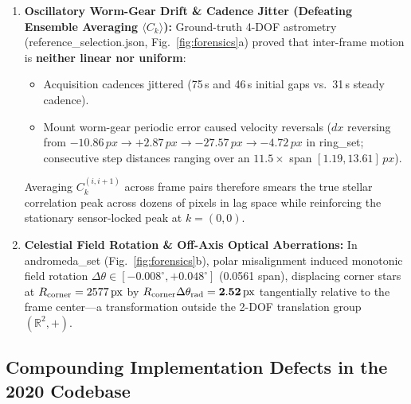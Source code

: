 \documentclass[10pt,twocolumn,letterpaper]{article}
\DeclareRobustCommand{\code}[1]{\texttt{#1}}
\def\code#1{#1}%
\def\bm#1{#1}%
\def\allowbreak{}%
\begin{document}
\begin{enumerate}
  \item \textbf{Oscillatory Worm-Gear Drift \& Cadence Jitter (Defeating Ensemble Averaging $\langle C_{\bm{k}} \rangle$):}
  Ground-truth 4-DOF astrometry (\code{reference\_\allowbreak selection.json}, Fig.~\ref{fig:forensics}a) proved that inter-frame motion is \textbf{neither linear nor uniform}:
  \begin{itemize}
    \item Acquisition cadences jittered (\code{75\,s} and \code{46\,s} initial gaps vs.\ \code{31\,s} steady cadence).
    \item Mount worm-gear periodic error caused velocity reversals ($\code{dx}$ reversing from $\code{-10.86\,px} \to \code{+2.87\,px} \to \code{-27.57\,px} \to \code{-4.72\,px}$ in \code{ring\_set}; consecutive step distances ranging over an $11.5\times$ span $\code{[1.19, 13.61]\,px}$).
  \end{itemize}
  Averaging $C_{\bm{k}}^{(i, i+1)}$ across frame pairs therefore smears the true stellar correlation peak across dozens of pixels in lag space while reinforcing the stationary sensor-locked peak at $\bm{k} = (0, 0)$.

  \item \textbf{Celestial Field Rotation \& Off-Axis Optical Aberrations:}
  In \code{andromeda\_set} (Fig.~\ref{fig:forensics}b), polar misalignment induced monotonic field rotation $\Delta\theta \in [-0.008^\circ, +0.048^\circ]$ (\code{0.0561\textdegree} span), displacing corner stars at $R_{\text{corner}} = 2577\text{\,px}$ by $R_{\text{corner}} \Delta\theta_{\text{rad}} = \mathbf{2.52\text{\,px}}$ tangentially relative to the frame center---a transformation outside the 2-DOF translation group $(\mathbb{R}^2, +)$.
\end{enumerate}

\subsection{Compounding Implementation Defects in the 2020 Codebase}
\end{document}
